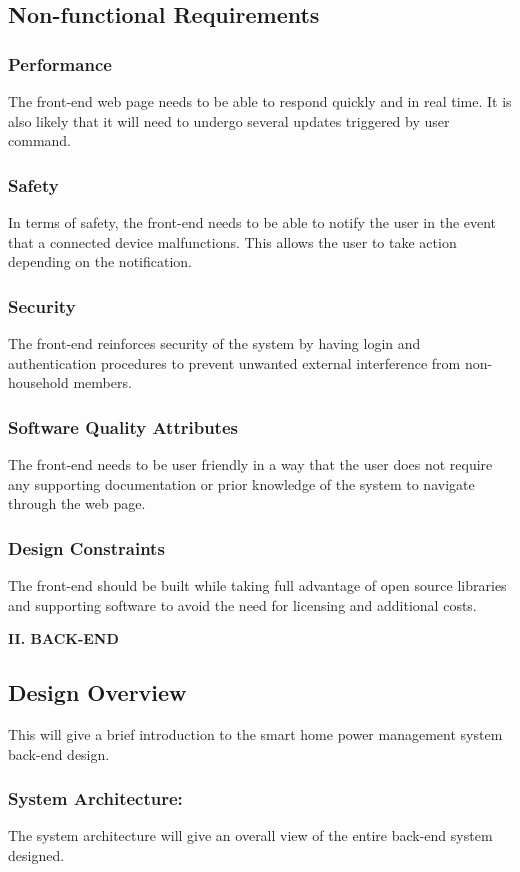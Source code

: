 \documentclass[10pt,twocolumn]{witseiepaper}
\begin{document}
	\subsection{Non-functional Requirements}
	\subsubsection{Performance}
	The front-end web page needs to be able to respond quickly and in real time. It is also likely that it will need to undergo several updates triggered by user command.
	\subsubsection{Safety}
	In terms of safety, the front-end needs to be able to notify the user in the event that a connected device malfunctions. This allows the user to take action depending on the notification.
	\subsubsection{Security}
	The front-end reinforces security of the system by having login and authentication procedures to prevent unwanted external interference from non-household members.
	\subsubsection{Software Quality Attributes}
	The front-end needs to be user friendly in a way that the user does not require any supporting documentation or prior knowledge of the system to navigate through the web page.
	\subsubsection{Design Constraints}
	The front-end should be built while taking full advantage of open source libraries and supporting software to avoid the need for licensing and additional costs.

	
	\begin{center}
		\textbf{II. BACK-END}
	\end{center}
	
	\subsection{Design Overview}
	This will give a brief introduction to the smart home power management system back-end design. 
	
	\subsubsection{System Architecture:}
	The system architecture will give an overall view of the entire back-end system designed. 
	
\end{document}
